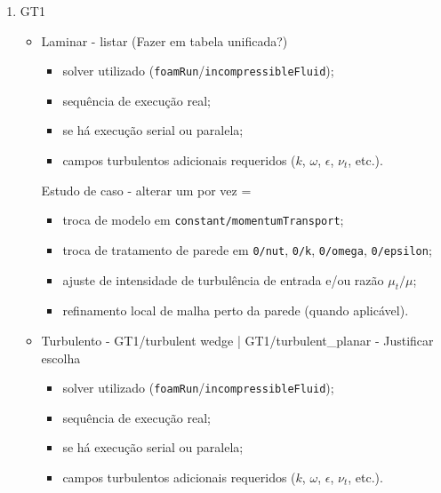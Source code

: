 \documentclass[12pt,a4paper]{article}
\begin{document}
    \begin{enumerate}
    
        \item GT1

            \begin{itemize}
                
                \item Laminar -  listar (Fazer em tabela unificada?)

                     \begin{itemize}
                        \item solver utilizado (\texttt{foamRun}/\texttt{incompressibleFluid});
                        \item sequência de execução real;
                        \item se há execução serial ou paralela;
                        \item campos turbulentos adicionais requeridos ($k$, $\omega$, $\epsilon$, $\nu_t$, etc.).
                      \end{itemize}

                        Estudo de caso - alterar um por vez = 

                    \begin{itemize}
                      \item troca de modelo em \texttt{constant/momentumTransport};
                      \item troca de tratamento de parede em \texttt{0/nut}, \texttt{0/k}, \texttt{0/omega}, \texttt{0/epsilon};
                      \item ajuste de intensidade de turbulência de entrada e/ou razão $\mu_t/\mu$;
                      \item refinamento local de malha perto da parede (quando aplicável).
                    \end{itemize}
                    
                \item Turbulento - GT1/turbulent wedge | GT1/turbulent\_planar - Justificar escolha

                     \begin{itemize}
                        \item solver utilizado (\texttt{foamRun}/\texttt{incompressibleFluid});
                        \item sequência de execução real;
                        \item se há execução serial ou paralela;
                        \item campos turbulentos adicionais requeridos ($k$, $\omega$, $\epsilon$, $\nu_t$, etc.).
                      \end{itemize}


\end{itemize}
\end{enumerate}
\end{document}
